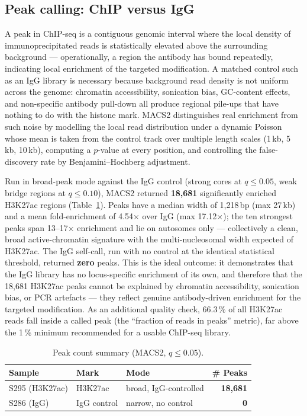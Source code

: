 \documentclass[11pt,a4paper]{article}
\begin{document}
\subsection*{Peak calling: ChIP versus IgG}
A peak in ChIP-seq is a contiguous genomic interval where the local density of immunoprecipitated reads is statistically elevated above the surrounding background — operationally, a region the antibody has bound repeatedly, indicating local enrichment of the targeted modification. A matched control such as an IgG library is necessary because background read density is not uniform across the genome: chromatin accessibility, sonication bias, GC-content effects, and non-specific antibody pull-down all produce regional pile-ups that have nothing to do with the histone mark. MACS2 distinguishes real enrichment from such noise by modelling the local read distribution under a dynamic Poisson whose mean is taken from the control track over multiple length scales (1\,kb, 5\,kb, 10\,kb), computing a $p$-value at every position, and controlling the false-discovery rate by Benjamini--Hochberg adjustment.

Run in broad-peak mode against the IgG control (strong cores at $q\!\leq\!0.05$, weak bridge regions at $q\!\leq\!0.10$), MACS2 returned \textbf{18{,}681} significantly enriched H3K27ac regions (Table~\ref{tab:peaks}). Peaks have a median width of 1{,}218\,bp (max 27\,kb) and a mean fold-enrichment of 4.54$\times$ over IgG (max 17.12$\times$); the ten strongest peaks span 13--17$\times$ enrichment and lie on autosomes only — collectively a clean, broad active-chromatin signature with the multi-nucleosomal width expected of H3K27ac. The IgG self-call, run with no control at the identical statistical threshold, returned \textbf{zero} peaks. This is the ideal outcome: it demonstrates that the IgG library has no locus-specific enrichment of its own, and therefore that the 18{,}681 H3K27ac peaks cannot be explained by chromatin accessibility, sonication bias, or PCR artefacts — they reflect genuine antibody-driven enrichment for the targeted modification. As an additional quality check, 66.3\,\% of all H3K27ac reads fall inside a called peak (the ``fraction of reads in peaks'' metric), far above the 1\,\% minimum recommended for a usable ChIP-seq library.

\begin{table}[h]
\centering
\caption{Peak count summary (MACS2, $q\!\leq\!0.05$).}
\label{tab:peaks}
\small
\begin{tabular}{lllr}
\toprule
Sample & Mark & Mode & \# Peaks \\
\midrule
S295 (H3K27ac) & H3K27ac      & broad, IgG-controlled & \textbf{18{,}681} \\
S286 (IgG)     & IgG control  & narrow, no control    & \textbf{0}        \\
\bottomrule
\end{tabular}
\end{table}
\end{document}
